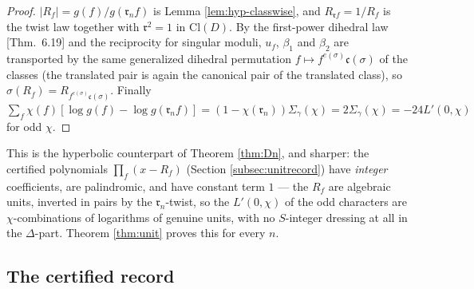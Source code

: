 \documentclass[11pt]{amsart}
\numberwithin{equation}{section}
\theoremstyle{plain}
\theoremstyle{definition}
\theoremstyle{remark}
\newcommand{\Cl}{\mathrm{Cl}}
\newcommand{\idealc}{\mathfrak{c}}
\newcommand{\idealr}{\mathfrak{r}}
\newcommand{\PaperI}{\cite{SchmidtI}}
\begin{document}
\begin{proof}
$|R_f| = g(f)/g(\idealr_nf)$ is Lemma \ref{lem:hyp-classwise}, and
$R_{\idealr f} = 1/R_f$ is the twist law together with $\idealr^2 = 1$ in
$\Cl(D)$.  By the first-power dihedral law \PaperI[Thm.~6.19] and the
reciprocity for singular moduli, $u_f$, $\beta_1$ and $\beta_2$ are
transported by the same generalized dihedral permutation $f \mapsto
f^{e(\sigma)}\idealc(\sigma)$ of the classes (the translated pair is
again the canonical pair of the translated class), so $\sigma(R_f) =
R_{f^{e(\sigma)}\idealc(\sigma)}$.  Finally
$\sum_f\chi(f)[\log g(f) - \log g(\idealr_nf)] = (1 - \chi(\idealr_n))
\Sigma_\gamma(\chi) = 2\Sigma_\gamma(\chi) = -24L'(0,\chi)$ for odd $\chi$.
\end{proof}

This is the hyperbolic counterpart of Theorem \ref{thm:Dn}, and sharper:
the certified polynomials $\prod_f(x - R_f)$ (Section
\ref{subsec:unitrecord}) have \emph{integer} coefficients, are
palindromic, and have constant term $1$ --- the $R_f$ are algebraic units,
inverted in pairs by the $\idealr_n$-twist, so the $L'(0,\chi)$ of the odd
characters are $\chi$-combinations of logarithms of genuine units, with
no $S$-integer dressing at all in the $\Delta$-part.  Theorem
\ref{thm:unit} proves this for every $n$.

\subsection{The certified record}\label{subsec:record}
\end{document}
